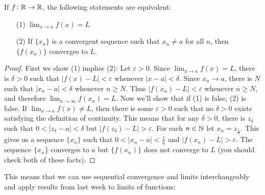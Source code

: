 \documentclass[../notes.tex]{subfiles}
\begin{document}
\begin{prop}
\label{prop:seqs-and-limits}
    If $f\colon\mathbb R\to \mathbb R$, the following statements are equivalent:
    \begin{itemize}
        \item[(1)]$\lim_{x\to a}f(x) = L$
        \item[(2)] If $\{x_n\}$ is a convergent sequence such that $x_n\neq a$ for all $n$, then $\{f(x_n)\}$ converges to $L$. 
    \end{itemize}
\end{prop}
\begin{proof}
    First we show (1) implies (2): Let $\varepsilon>0$. Since $\lim_{x\to a}f(x)=L$, there is $\delta>0$ such that $|f(x)-L| < \varepsilon$ whenever $|x-a|<\delta$. Since $x_n \to a$, there is $N$ such that $|x_n-a| < \delta$ whenever $n\geq N$. Thus $|f(x_n)-L| < \varepsilon$ whenever $n\geq N$, and therefore $\lim_{n\to \infty} f(x_n) = L$. Now we'll show that if (1) is false, (2) is false. If $\lim_{x\to a}f(x) \neq L$, then there is some $\varepsilon>0$ such that no $\delta > 0$ exists satisfying the definition of continuity. This means that for any $\delta > 0$, there is $z_\delta$ such that $0 < |z_\delta - a | < \delta$ but $|f(z_\delta) - L| > \varepsilon$. For each $n\in \mathbb N$ let $x_n = z_{\frac{1}{n}}$. This gives us a sequence $\{x_n\}$ such that $0 < |x_n- a| < \frac{1}{n}$ and $|f(x_n) - L|  >\varepsilon$. The sequence $\{x_n\}$ converges to $a$ but $\{f(x_n)\}$ does not converge to $L$ (you should check both of these facts). 
\end{proof}


This means that we can use sequential convergence and limits interchangeably and apply results from last week to limits of functions: 
\end{document}
